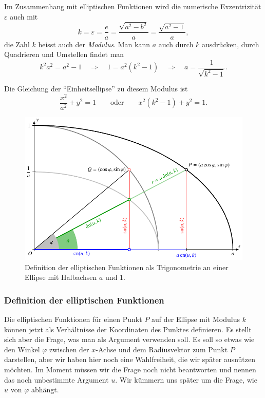 Im Zusammenhang mit elliptischen Funktionen wird die numerische Exzentrizität
$\varepsilon$ auch mit
\[
k
=
\varepsilon
=
\frac{e}{a}
=
\frac{\sqrt{a^2-b^2}}{a}
=
\frac{\sqrt{a^2-1}}{a},
\]
die Zahl $k$ heisst auch der {\em Modulus}.
Man kann $a$ auch durch $k$ ausdrücken, durch Quadrieren und Umstellen
findet man
\[
k^2a^2 = a^2-1
\quad\Rightarrow\quad
1=a^2(k^2-1)
\quad\Rightarrow\quad
a=\frac{1}{\sqrt{k^2-1}}.
\]

Die Gleichung der ``Einheitsellipse'' zu diesem Modulus ist
\[
\frac{x^2}{a^2}+y^2=1
\qquad\text{oder}\qquad
x^2(k^2-1) + y^2 = 1.
\]

%
%
\begin{figure}
\centering
\includegraphics{chapters/110-elliptisch/images/jacobidef.pdf}
\caption{Definition der elliptischen Funktionen als Trigonometrie
an einer Ellipse mit Halbachsen $a$ und $1$.
\label{buch:elliptisch:fig:jacobidef}}
\end{figure}
\subsubsection{Definition der elliptischen Funktionen}
Die elliptischen Funktionen für einen Punkt $P$ auf der Ellipse mit Modulus $k$
können jetzt als Verhältnisse der Koordinaten des Punktes definieren.
Es stellt sich aber die Frage, was man als Argument verwenden soll.
Es soll so etwas wie den Winkel $\varphi$ zwischen der $x$-Achse und dem
Radiusvektor zum Punkt $P$
darstellen, aber wir haben hier noch eine Wahlfreiheit, die wir später
ausnützen möchten.
Im Moment müssen wir die Frage noch nicht beantworten und nennen das
noch unbestimmte Argument $u$.
Wir kümmern uns später um die Frage, wie $u$ von $\varphi$ abhängt.

